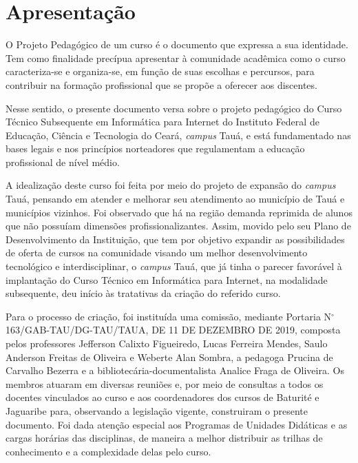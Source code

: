 \documentclass[
	12pt,				%
	openright,			%
	twoside,			%
	a4paper,			%
	chapter=TITLE,		%
	english,			%
	french,				%
	spanish,			%
	brazil,				%
	]{abntex2}
\begin{document}
\textual


\normalsize

\chapter{Apresentação}


%  
 
 O Projeto Pedagógico de um curso é o documento que expressa a sua identidade.
 Tem como finalidade precípua apresentar à comunidade acadêmica como o curso
 caracteriza-se e organiza-se, em função de suas escolhas e percursos, para
 contribuir na formação profissional que se propõe a oferecer aos discentes.
 
 Nesse sentido, o presente documento versa sobre o projeto pedagógico do Curso
 Técnico Subsequente em Informática para Internet do Instituto Federal de
 Educação, Ciência e Tecnologia do Ceará, \textit{campus} Tauá, e está
 fundamentado nas bases legais e nos princípios norteadores que regulamentam a
 educação profissional de nível médio.
 
 
 A idealização deste curso foi feita por meio do projeto de expansão do
 \textit{campus} Tauá, pensando em atender e melhorar seu atendimento ao município
 de Tauá e municípios vizinhos. 
 Foi observado que há na região demanda reprimida de alunos que
 não possuíam dimensões profissionalizantes. Assim, movido pelo seu Plano de Desenvolvimento da Instituição, que tem por
 objetivo expandir as possibilidades de oferta de cursos na comunidade visando
 um melhor desenvolvimento tecnológico e interdisciplinar, o \textit{campus} Tauá, que já tinha o parecer favorável à implantação 
 do Curso Técnico em Informática para Internet, na modalidade subsequente, deu início às tratativas da criação do referido curso.
 
 
 Para o processo de criação, foi instituída uma comissão, mediante
 Portaria N$^\circ$ 163/GAB-TAU/DG-TAU/TAUA, DE 11 DE DEZEMBRO DE 2019, composta pelos professores
 Jefferson Calixto Figueiredo, Lucas Ferreira Mendes, Saulo Anderson Freitas de
 Oliveira e Weberte Alan Sombra, a pedagoga Prucina de Carvalho Bezerra
 e a  bibliotecária-documentalista 
Analice Fraga de Oliveira. Os membros atuaram
 em diversas reuniões e, por meio de consultas a todos os docentes vinculados
 ao curso e aos coordenadores dos cursos de Baturité e Jaguaribe  para, observando a legislação vigente, construiram o
 presente documento. Foi dada atenção especial aos Programas de Unidades Didáticas
 e as cargas horárias das disciplinas, de maneira a melhor distribuir as trilhas de conhecimento e a complexidade
 delas pelo curso.
 
\end{document}
